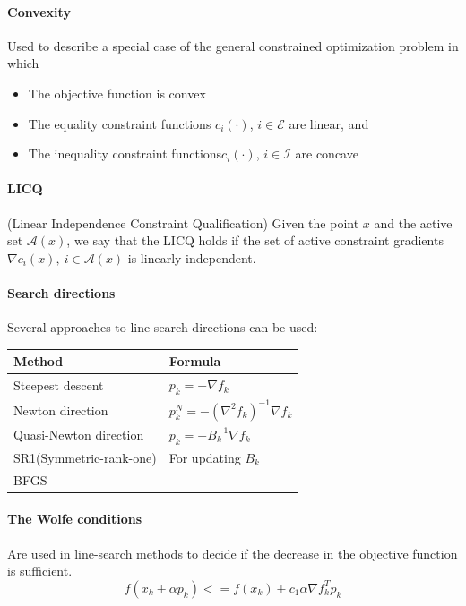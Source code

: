 
\paragraph{Convexity} Used to describe a special case of the general constrained optimization problem in which
\begin{itemize}[nolistsep,noitemsep]
    \item The objective function is convex
    \item The equality constraint functions $c_i(\cdot)$, $i \in \mathcal{E}$ are linear, and
    \item The inequality constraint functions$c_i(\cdot)$, $i \in \mathcal{I}$ are concave
\end{itemize}

\paragraph{LICQ} (Linear Independence Constraint Qualification) Given the point $x$ and the active set $\mathcal{A}(x)$, we say that the LICQ holds if the set of active constraint gradients $\nabla c_i (x), \: i \in \mathcal{A}(x)$ is linearly independent.

\paragraph{Search directions} Several approaches to line search directions can be used:

\hskip-0.5cm
\begin{tabularx}{\linewidth}{X X}
	\textbf{Method} & \textbf{Formula}\\
	\hline
	Steepest descent & $p_k=-\nabla f_k$\\
	Newton direction & $p_k^N=-(\nabla^2 f_k)^{-1}\nabla f_k$ \\
	Quasi-Newton direction & $p_k=-B_k^{-1}\nabla f_k$ \\
	\quad SR1(Symmetric-rank-one) & For updating $B_k$\\
	\quad BFGS & \\
\end{tabularx}

\paragraph{The Wolfe conditions} 
Are used in line-search methods to decide if the decrease in the objective function is sufficient.
\begin{equation}
    f(x_k+\alpha p_k) <= f(x_k) + c_1 \alpha \nabla f_k^T p_k
\end{equation}

